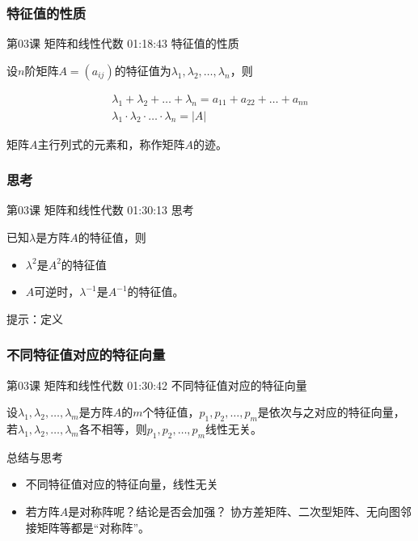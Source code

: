 \documentclass[UTF8]{ctexbook}
\begin{document}
\subsubsection{特征值的性质}

第03课 矩阵和线性代数 01:18:43 特征值的性质

设$n$阶矩阵$A=(a_{ij})$的特征值为$\lambda_{1},\lambda_{2},\dots,\lambda_{n}$，则

\begin{equation}
\begin{aligned}
\lambda_{1}+\lambda_{2}+\dots+\lambda_{n}
=a_{11}+a_{22}+\dots+a_{nn} \\
\lambda_{1} \cdot \lambda_{2} \cdot \dots \cdot \lambda_{n} = |A|
\end{aligned}
\end{equation}

矩阵$A$主行列式的元素和，称作矩阵$A$的迹。


\subsubsection{思考}

第03课 矩阵和线性代数 01:30:13 思考

已知$\lambda$是方阵$A$的特征值，则

\begin{itemize}
\item $\lambda^{2}$是$A^{2}$的特征值
\item $A$可逆时，$\lambda^{-1}$是$A^{-1}$的特征值。
\end{itemize}

提示：定义

\subsubsection{不同特征值对应的特征向量}

第03课 矩阵和线性代数 01:30:42 不同特征值对应的特征向量

设$\lambda_{1},\lambda_{2},\dots,\lambda_{m}$是方阵$A$的$m$个特征值，$p_{1},p_{2},\dots,p_{m}$是依次与之对应的特征向量，若$\lambda_{1},\lambda_{2},\dots,\lambda_{m}$各不相等，则$p_{1},p_{2},\dots,p_{m}$线性无关。

总结与思考

\begin{itemize}
\item 不同特征值对应的特征向量，线性无关
\item 若方阵$A$是对称阵呢？结论是否会加强？ 协方差矩阵、二次型矩阵、无向图邻接矩阵等都是“对称阵”。
\end{itemize}
\end{document}

